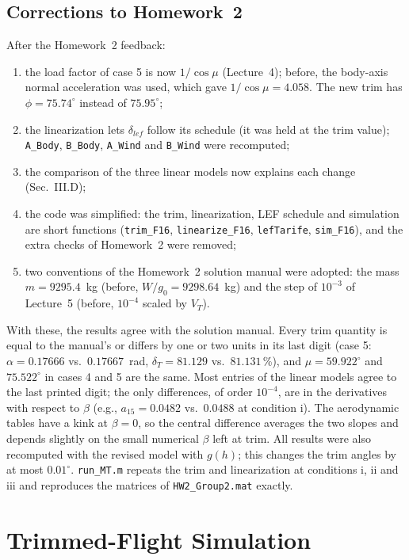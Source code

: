 \documentclass[conf]{new-aiaa}
\begin{document}
\subsection{Corrections to Homework~2}
After the Homework~2 feedback:
\begin{enumerate}
\item the load factor of case 5 is now $1/\cos\mu$ (Lecture~4); before, the body-axis normal acceleration was used, which gave $1/\cos\mu=4.058$. The new trim has $\phi=75.74^\circ$ instead of $75.95^\circ$;
\item the linearization lets $\delta_{lef}$ follow its schedule (it was held at the trim value); \texttt{A\_Body}, \texttt{B\_Body}, \texttt{A\_Wind} and \texttt{B\_Wind} were recomputed;
\item the comparison of the three linear models now explains each change (Sec.~III.D);
\item the code was simplified: the trim, linearization, LEF schedule and simulation are short functions (\texttt{trim\_F16}, \texttt{linearize\_F16}, \texttt{lefTarife}, \texttt{sim\_F16}), and the extra checks of Homework~2 were removed;
\item two conventions of the Homework~2 solution manual were adopted: the mass $m=9295.4$~kg (before, $W/g_0=9298.64$~kg) and the step of $10^{-3}$ of Lecture~5 (before, $10^{-4}$ scaled by $V_T$).
\end{enumerate}
With these, the results agree with the solution manual. Every trim quantity is equal to the manual's or differs by one or two units in its last digit (case 5: $\alpha=0.17666$ vs.\ $0.17667$~rad, $\delta_T=81.129$ vs.\ $81.131$\,\%), and $\mu=59.922^\circ$ and $75.522^\circ$ in cases 4 and 5 are the same. Most entries of the linear models agree to the last printed digit; the only differences, of order $10^{-4}$, are in the derivatives with respect to $\beta$ (e.g., $a_{15}=0.0482$ vs.\ $0.0488$ at condition i). The aerodynamic tables have a kink at $\beta=0$, so the central difference averages the two slopes and depends slightly on the small numerical $\beta$ left at trim. All results were also recomputed with the revised model with $g(h)$; this changes the trim angles by at most $0.01^\circ$. \texttt{run\_MT.m} repeats the trim and linearization at conditions i, ii and iii and reproduces the matrices of \texttt{HW2\_Group2.mat} exactly.

\section{Trimmed-Flight Simulation}
\end{document}
